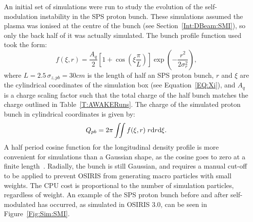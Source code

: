 An initial set of simulations were run to study the evolution of the self-modulation instability in the SPS proton bunch.
These simulations assumed the plasma was ionised at the centre of the bunch (see Section~\ref{Int:DBeam:SMI}), so only the back half of it was actually simulated.
The bunch profile function used took the form:
\begin{equation}
    f(\xi,r) = \frac{A_{q}}{2} \left[1 + \cos\left(\xi\frac{\pi}{L}\right)\right] \exp\left(-\frac{r^{2}}{2\sigma_{r}^{2}}\right), \label{EQ:SPS-Profile}
\end{equation}
where $L = 2.5\,\sigma_{z,pb} = 30\unit{cm}$ is the length of half an SPS proton bunch, $r$ and $\xi$ are the cylindrical coordinates of the simulation box (see Equation~\ref{EQ:Xi}), and $A_{q}$ is a charge scaling factor such that the total charge of the half bunch matches the charge outlined in Table~\ref{T:AWAKERuns}.
The charge of the simulated proton bunch in cylindrical coordinates is given by:
\begin{equation}
    Q_{pb} = 2\pi \iint f(\xi,r) \;r \mathrm{d} r \mathrm{d} \xi. \label{EQ:SPS-Charge}
\end{equation}
A half period cosine function for the longitudinal density profile is more convenient for simulations than a Gaussian shape, as the cosine goes to zero at a finite length~\cite{lotov:2010}.
Radially, the bunch is still Gaussian, and requires a manual cut-off to be applied to prevent OSIRIS from generating macro particles with small weights.
The CPU cost is proportional to the number of simulation particles, regardless of weight.
An example of the SPS proton bunch before and after self-modulated has occurred, as simulated in OSIRIS 3.0, can be seen in Figure~\ref{Fig:Sim:SMI}.

